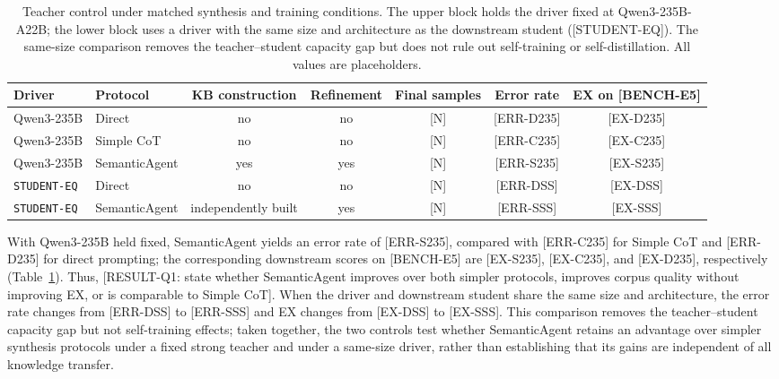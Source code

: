 \documentclass[letterpaper,journal]{IEEEtran}
\begin{document}
\begin{table}[!t]
\centering
\caption{Teacher control under matched synthesis and training conditions. The upper block holds the driver fixed at Qwen3-235B-A22B; the lower block uses a driver with the same size and architecture as the downstream student ([STUDENT-EQ]). The same-size comparison removes the teacher--student capacity gap but does not rule out self-training or self-distillation. All values are placeholders.}
\label{tab:teacher-control}
\small
\setlength{\tabcolsep}{4pt}
\renewcommand{\arraystretch}{1.15}
\begin{tabular}{llccccc}
\toprule
\textbf{Driver} & \textbf{Protocol} & \textbf{KB construction} & \textbf{Refinement} & \textbf{Final samples} & \textbf{Error rate} & \textbf{EX on [BENCH-E5]} \\
\midrule
Qwen3-235B & Direct & no & no & [N] & [ERR-D235] & [EX-D235] \\
Qwen3-235B & Simple CoT & no & no & [N] & [ERR-C235] & [EX-C235] \\
Qwen3-235B & SemanticAgent & yes & yes & [N] & [ERR-S235] & [EX-S235] \\
\midrule
\texttt{STUDENT-EQ} & Direct & no & no & [N] & [ERR-DSS] & [EX-DSS] \\
\texttt{STUDENT-EQ} & SemanticAgent & independently built & yes & [N] & [ERR-SSS] & [EX-SSS] \\
\bottomrule
\end{tabular}
\end{table}

With Qwen3-235B held fixed, SemanticAgent yields an error rate of [ERR-S235], compared with [ERR-C235] for Simple CoT and [ERR-D235] for direct prompting; the corresponding downstream scores on [BENCH-E5] are [EX-S235], [EX-C235], and [EX-D235], respectively (Table~\ref{tab:teacher-control}). Thus, [RESULT-Q1: state whether SemanticAgent improves over both simpler protocols, improves corpus quality without improving EX, or is comparable to Simple CoT]. When the driver and downstream student share the same size and architecture, the error rate changes from [ERR-DSS] to [ERR-SSS] and EX changes from [EX-DSS] to [EX-SSS]. This comparison removes the teacher--student capacity gap but not self-training effects; taken together, the two controls test whether SemanticAgent retains an advantage over simpler synthesis protocols under a fixed strong teacher and under a same-size driver, rather than establishing that its gains are independent of all knowledge transfer.
\end{document}
